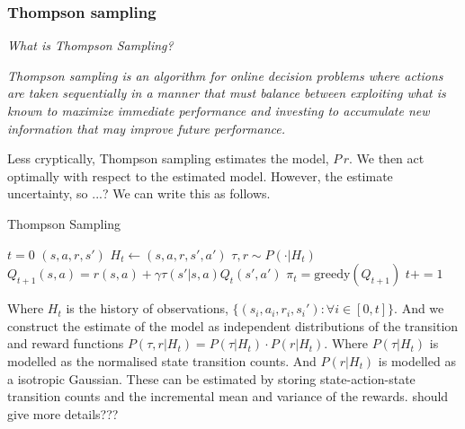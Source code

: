
\subsubsection{Thompson sampling} \label{ts}
\begin{displayquote}
	\textsl{What is Thompson Sampling?}
\end{displayquote}

\begin{displayquote}
	\textit{Thompson sampling is an algorithm for online decision problems where actions are taken sequentially in a manner that
must balance between exploiting what is known to maximize immediate performance and investing to accumulate
new information that may improve future performance.}\cite{Russo2017}
\end{displayquote}

Less cryptically, Thompson sampling estimates the model, $P\, r$. We then act optimally with respect to the estimated model. However, the estimate uncertainty, so ...? We can write this as follows.

\begin{algorithm}
	\caption{Thompson Sampling}
	\begin{algorithmic}[1]

		\State $t=0$
		\State $(s, a, r, s')$ 
		\State $H_t \leftarrow (s, a, r, s', a')$ 
		\State $\tau, r \sim P(\cdot | H_t)$ 
		\State $Q_{t+1}(s, a) = r(s, a) + \gamma \tau(s'| s, a) Q_t(s', a')$ 
		\State $\pi_t = \text{greedy}(Q_{t+1})$ 
		\State $t += 1$

		\EndWhile
		\State {}
		\EndProcedure

	\end{algorithmic}
\end{algorithm}

Where $H_t$ is the history of observations, $\{(s_i, a_i, r_i, s_i') : \forall i \in [0, t]\}$.
And we construct the estimate of the model as independent distributions of the transition and reward functions $P(\tau, r | H_t) = P(\tau | H_t) \cdot P(r | H_t)$. Where $P(\tau | H_t)$
is modelled as the normalised state transition counts.
And $P(r | H_t)$ is modelled as a isotropic Gaussian.
These can be estimated by storing state-action-state transition counts
and the incremental mean and variance of the rewards. {\color{red}should give more details???}

